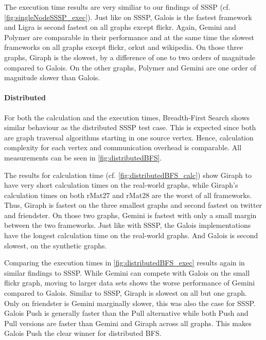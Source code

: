 The execution time results are very similiar to our findings of SSSP (cf. \autoref{fig:singleNodeSSSP_exec}). Just like on SSSP, Galois is the fastest framework and Ligra is second fastest on all graphs except flickr.
Again, Gemini and Polymer are comparable in their performance and at the same time the slowest frameworks on all graphs except flickr, orkut and wikipedia.
On those three graphs, Giraph is the slowest, by a difference of one to two orders of magnitude compared to Galois.
On the other graphs, Polymer and Gemini are one order of magnitude slower than Galois.

\paragraph{Distributed}
For both the calculation and the execution times, Breadth-First Search shows similar behaviour as the distributed SSSP test case. This is expected since both are graph traversal algorithms starting in one source vertex.
Hence, calculation complexity for each vertex and communication overhead is comparable. All measurements can be seen in \autoref{fig:distributedBFS}.

The results for calculation time (cf. \autoref{fig:distributedBFS_calc}) show Giraph to have very short calculation times on the real-world graphs, while Giraph's calculation times on both rMat27 and rMat28 are the worst of all frameworks. Thus, Giraph is fastest on the three smallest graphs and second fastest on twitter and friendster. On those two graphs, Gemini is fastest with only a small margin between the two frameworks.
Just like with SSSP, the Galois implementations have the longest calculation time on the real-world graphs. And Galois is second slowest, on the synthetic graphs.

Comparing the execution times in \autoref{fig:distributedBFS_exec} results again in similar findings to SSSP.
While Gemini can compete with Galois on the small flickr graph, moving to larger data sets shows the worse performance of Gemini compared to Galois.
Similar to SSSP, Giraph is slowest on all but one graph. Only on friendster is Gemini marginally slower, this was also the case for SSSP.
Galois Push is generally faster than the Pull alternative while both Push and Pull versions are faster than Gemini and Giraph across all graphs.
This makes Galois Push the clear winner for distributed BFS.

